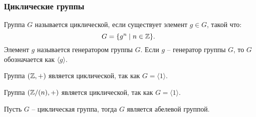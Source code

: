 \subsubsection{Циклические группы}
\begin{definition}
    Группа $G$ называется циклической, если существует элемент $g \in G$, такой что:
    \[
        G = \{g^n \mid n \in \mathbb Z\}.
    \]
    Элемент $g$ называется генератором группы $G$.
    Если $g$ -- генератор группы $G$, то $G$ обозначается как $\langle g \rangle$.
\end{definition}
\begin{example}
    Группа $(\mathbb Z, +)$ является циклической, так как $G = \langle 1 \rangle$.
\end{example}
\begin{example}
    Группа $(\mathbb Z/{(n)}, +)$ является циклической, так как $G = \langle 1 \rangle$.
\end{example}
\begin{theorem}
    Пусть $G$ -- циклическая группа, тогда $G$ является абелевой группой.
\end{theorem}
